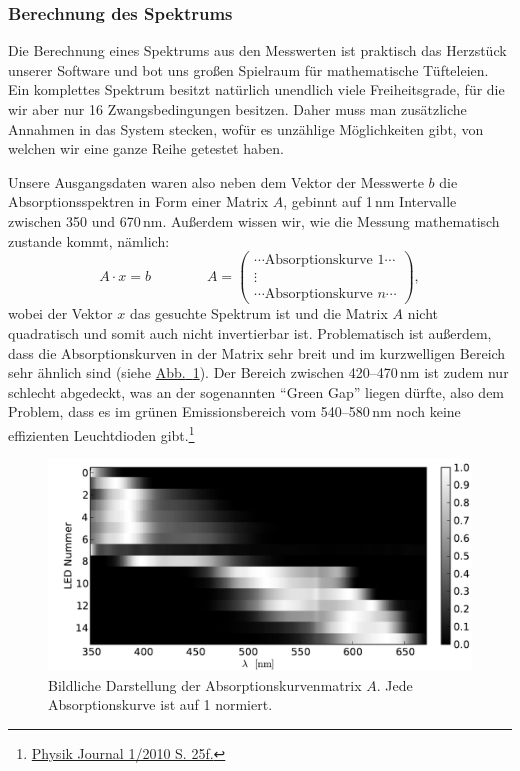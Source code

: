 \documentclass[11pt]{scrartcl}
\newcommand{\hypref}[2]{\hyperref[#2]{{#1}~\ref{#2}}}
\begin{document}
\subsubsection{Berechnung des Spektrums}
Die Berechnung eines Spektrums aus den Messwerten ist praktisch das Herzstück unserer Software und bot uns großen Spielraum für mathematische Tüfteleien.
Ein komplettes Spektrum besitzt natürlich unendlich viele Freiheitsgrade, für die wir aber nur 16 Zwangsbedingungen besitzen.
Daher muss man zusätzliche Annahmen in das System stecken, wofür es unzählige Möglichkeiten gibt, von welchen wir eine ganze Reihe getestet haben.

Unsere Ausgangsdaten waren also neben dem Vektor der Messwerte $b$ die Absorptionsspektren in Form einer Matrix $A$, gebinnt auf 1\,nm Intervalle zwischen 350 und 670\,nm. Außerdem wissen wir, wie die Messung mathematisch zustande kommt, nämlich:
\begin{equation}
A\cdot x = b
\qquad\qquad
A =
\begin{pmatrix}
\cdots \text{Absorptionskurve 1} \cdots \\
\vdots \\
\cdots \text{Absorptionskurve $n$} \cdots
\end{pmatrix},
\end{equation}
wobei der Vektor $x$ das gesuchte Spektrum ist und die Matrix $A$ nicht quadratisch und somit auch nicht invertierbar ist.
Problematisch ist außerdem, dass die Absorptionskurven in der Matrix sehr breit und im kurzwelligen Bereich sehr ähnlich sind (siehe \hypref{Abb.}{fig:matrixA}).
Der Bereich zwischen 420--470\,nm ist zudem nur schlecht abgedeckt, was an der sogenannten "`Green Gap"' liegen dürfte, also dem Problem, dass es im grünen Emissionsbereich vom 540--580\,nm noch keine effizienten Leuchtdioden gibt.\footnote{\href{http://www.pro-physik.de/Phy/pdfstart.do?mid=3&articleid=51055&recordid=51193}{Physik Journal 1/2010 S. 25f.}}

\begin{figure}[H]
\begin{center}
\includegraphics[width=1\textwidth]{matrix_A.pdf}
\end{center}
\vspace{-1.5\baselineskip}
\caption{Bildliche Darstellung der Absorptionskurvenmatrix $A$. Jede Absorptionskurve ist auf 1 normiert.}
\label{fig:matrixA}
\end{figure}
\end{document}
